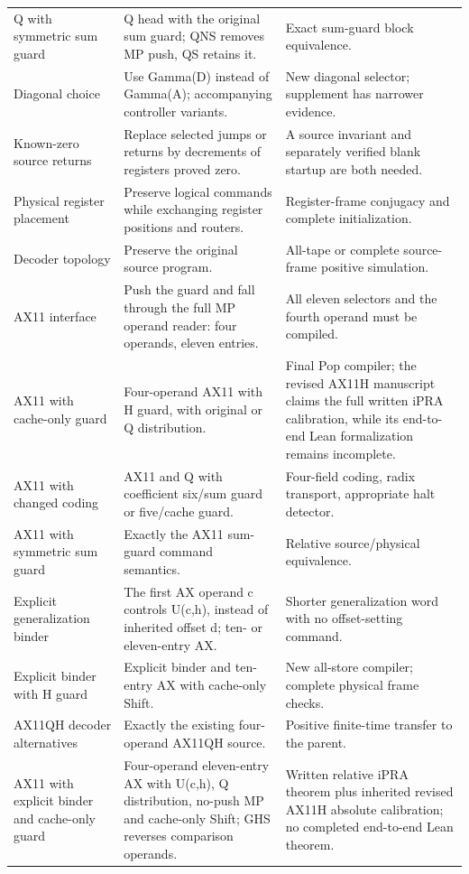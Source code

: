 \begin{longtable}{p{}p{}p{}}
Q with symmetric sum guard & Q head with the original sum guard; QNS removes MP push, QS retains it. & Exact sum-guard block equivalence. \\
Diagonal choice & Use Gamma(D) instead of Gamma(A); accompanying controller variants. & New diagonal selector; supplement has narrower evidence. \\
Known-zero source returns & Replace selected jumps or returns by decrements of registers proved zero. & A source invariant and separately verified blank startup are both needed. \\
Physical register placement & Preserve logical commands while exchanging register positions and routers. & Register-frame conjugacy and complete initialization. \\
Decoder topology & Preserve the original source program. & All-tape or complete source-frame positive simulation. \\
AX11 interface & Push the guard and fall through the full MP operand reader: four operands, eleven entries. & All eleven selectors and the fourth operand must be compiled. \\
AX11 with cache-only guard & Four-operand AX11 with H guard, with original or Q distribution. & Final Pop compiler; the revised AX11H manuscript claims the full written iPRA calibration, while its end-to-end Lean formalization remains incomplete. \\
AX11 with changed coding & AX11 and Q with coefficient six/sum guard or five/cache guard. & Four-field coding, radix transport, appropriate halt detector. \\
AX11 with symmetric sum guard & Exactly the AX11 sum-guard command semantics. & Relative source/physical equivalence. \\
Explicit generalization binder & The first AX operand c controls U(c,h), instead of inherited offset d; ten- or eleven-entry AX. & Shorter generalization word with no offset-setting command. \\
Explicit binder with H guard & Explicit binder and ten-entry AX with cache-only Shift. & New all-store compiler; complete physical frame checks. \\
AX11QH decoder alternatives & Exactly the existing four-operand AX11QH source. & Positive finite-time transfer to the parent. \\
AX11 with explicit binder and cache-only guard & Four-operand eleven-entry AX with U(c,h), Q distribution, no-push MP and cache-only Shift; GHS reverses comparison operands. & Written relative iPRA theorem plus inherited revised AX11H absolute calibration; no completed end-to-end Lean theorem. \\

\end{longtable}
